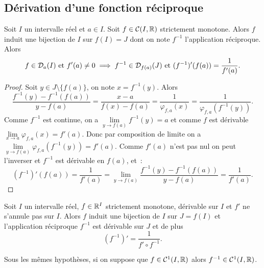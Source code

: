 \subsection{Dérivation d'une fonction réciproque}

\begin{theo}
  Soit \(I\) un intervalle réel et \(a \in I\). Soit \(f \in \mathcal{C}(I,\mathbb{R})\) 
  strictement monotone. Alors \(f\) induit une bijection de \(I\) sur \(f(I)=J\) 
  dont on note \(f^{-1}\) l'application réciproque. Alors
  \begin{equation}
    f \in \mathcal{D}_{a}(I) \text{~et~} f'(a) \neq 0 \implies f^{-1} \in \mathcal{D}_{f(a)}(J) 
    \text{~et~} (f^{-1})'(f(a))=\frac{1}{f'(a)}.
  \end{equation}
\end{theo}
\begin{proof}
  Soit \(y \in J \setminus \{f(a)\}\), on note \(x=f^{-1}(y)\). Alors
  \begin{equation}
    \frac{f^{-1}(y)-f^{-1}(f(a))}{y-f(a)}=\frac{x-a}{f(x)-f(a)} = 
    \frac{1}{\varphi_{f,a}(x)}=\frac{1}{\varphi_{f,a}(f^{-1}(y))}.
  \end{equation}
  Comme \(f^{-1}\) est continue, on a \(\lim\limits_{y \to f(a)}f^{-1}(y) = a\) 
  et comme \(f\) est dérivable \(\lim\limits_{x \to a} \varphi_{f,a}(x)=f'(a)\). 
  Donc par composition de limite on a \(\lim\limits_{y \to 
  f(a)}\varphi_{f,a}(f^{-1}(y))=f'(a)\). Comme \(f'(a)\) n'est pas nul on peut 
  l'inverser et \(f^{-1}\) est dérivable en \(f(a)\), et~:
  \begin{equation}
    (f^{-1})'(f(a))=\frac{1}{f'(a)} = \lim\limits_{y \to f(a)} 
    \frac{f^{-1}(y)-f^{-1}(f(a))}{y-f(a)} = \frac{1}{f'(a)}.
  \end{equation}
\end{proof}
\begin{corth}
  Soit \(I\) un intervalle réel, \(f \in \mathbb{R}^I\) strictement monotone, dérivable 
  sur \(I\) et \(f'\) ne s'annule pas sur \(I\). Alors \(f\) induit une 
  bijection de \(I\) sur \(J=f(I)\) et l'application réciproque \(f^{-1}\) est 
  dérivable sur \(J\) et de plus
  \begin{equation}
    (f^{-1})'=\frac{1}{f' \circ f^{-1}}.
  \end{equation}
\end{corth}
\begin{corth}
  Sous les mêmes hypothèses, si on suppose que \(f \in \mathcal{C}^{1}(I,\mathbb{R})\) alors 
  \(f^{-1} \in \mathcal{C}^{1}(I,\mathbb{R})\).
\end{corth}

